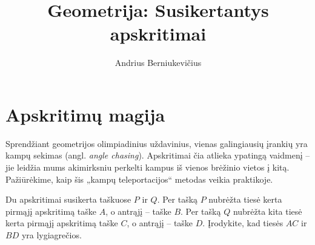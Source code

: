 \documentclass[11pt,a4paper]{scrartcl}
\title{Geometrija: Susikertantys apskritimai}
\author{Andrius Berniukevičius}
\begin{document}
\maketitle

\section{Apskritimų magija}
Sprendžiant geometrijos olimpiadinius uždavinius, vienas galingiausių įrankių yra kampų sekimas (angl. \textit{angle chasing}). Apskritimai čia atlieka ypatingą vaidmenį – jie leidžia mums akimirksniu perkelti kampus iš vienos brėžinio vietos į kitą. Pažiūrėkime, kaip šis „kampų teleportacijos“ metodas veikia praktikoje.

\vspace{0.5cm}

\begin{example}
Du apskritimai susikerta taškuose \(P\) ir \(Q\). Per tašką \(P\) nubrėžta tiesė kerta pirmąjį apskritimą taške \(A\), o antrąjį -- taške \(B\). Per tašką \(Q\) nubrėžta kita tiesė kerta pirmąjį apskritimą taške \(C\), o antrąjį -- taške \(D\). Įrodykite, kad tiesės \(AC\) ir \(BD\) yra lygiagrečios.
\end{example}
\end{document}
